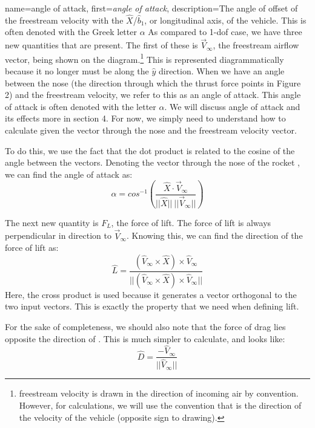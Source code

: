 \documentclass[12pt]{report}
\begin{document}
{
    name=angle of attack,
    first={\textit{angle of attack}},
    description={The angle of offset of the freestream velocity with the $\hat{X}$/$\hat{b}_1$, or longitudinal axis, of the vehicle. This is often denoted with the Greek letter $\alpha$}
}
As compared to 1-\gls{dof} case, we have three new quantities that are present. The first of these is $\vec{V}_{\infty}$, the freestream airflow vector, being shown on the diagram.\footnote{\gls{freestream} velocity  is drawn in the direction of incoming air by convention. However, for calculations, we will use the convention that  is the direction of the velocity of the vehicle (opposite sign to drawing).} This is represented diagrammatically because it no longer must be along the $\hat{y}$ direction. When we have an angle between the nose (the direction through which the thrust force points in Figure 2) and the \gls{freestream} velocity, we refer to this as an \gls{angle of attack}. This \gls{angle of attack} is often denoted with the letter $\alpha$. We will discuss \gls{angle of attack} and its effects more in section 4. For now, we simply need to understand how to calculate  given the vector through the nose and the \gls{freestream} velocity vector.

To do this, we use the fact that the dot product is related to the cosine of the angle between the vectors. Denoting the vector through the nose of the rocket , we can find the \gls{angle of attack} as:
\begin{equation}\label{eq:alpha}
    \alpha=cos^{-1}\left(\frac{\hat{X}\cdot \vec{V}_{\infty}}{||\hat{X}||\ ||\vec{V}_{\infty}||}\right)
\end{equation}

The next new quantity is $F_L$, the force of lift. The force of lift is always perpendicular in direction to $\vec{V}_{\infty}$. Knowing this, we can find the direction of the force of lift as:
\begin{equation}\label{eq:Lift}
    \hat{L}=\frac{(\hat{V}_{\infty} \times \hat{X}) \times \hat{V}_{\infty}}{||(\hat{V}_{\infty} \times \hat{X}) \times \hat{V}_{\infty}||}
\end{equation}
Here, the cross product is used because it generates a vector orthogonal to the two input vectors. This is exactly the property that we need when defining lift.

For the sake of completeness, we should also note that the force of drag lies opposite the direction of . This is much simpler to calculate, and looks like:
\begin{equation}\label{eq:drag}
\hat{D}=\frac{-\hat{V}_{\infty}}{||\hat{V}_{\infty}||}
\end{equation}
\end{document}
